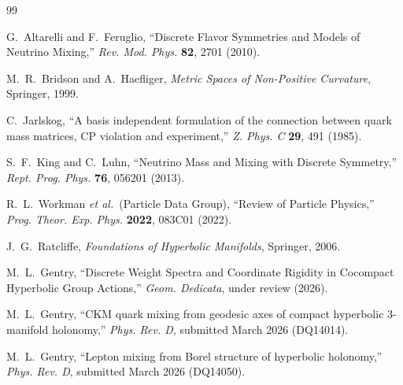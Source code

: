 \documentclass[12pt]{article}
\theoremstyle{definition}
\theoremstyle{remark}
\begin{document}
\begin{thebibliography}{99}

G.~Altarelli and F.~Feruglio,
``Discrete Flavor Symmetries and Models of Neutrino Mixing,''
\emph{Rev. Mod. Phys.} \textbf{82}, 2701 (2010).

M.~R.~Bridson and A.~Haefliger,
\emph{Metric Spaces of Non-Positive Curvature},
Springer, 1999.

C.~Jarlskog,
``A basis independent formulation of the connection between quark mass
matrices, {CP} violation and experiment,''
\emph{Z. Phys. C} \textbf{29}, 491 (1985).

S.~F.~King and C.~Luhn,
``Neutrino Mass and Mixing with Discrete Symmetry,''
\emph{Rept. Prog. Phys.} \textbf{76}, 056201 (2013).

R.~L.~Workman \emph{et al.}\ (Particle Data Group),
``Review of Particle Physics,''
\emph{Prog. Theor. Exp. Phys.} \textbf{2022}, 083C01 (2022).

J.~G.~Ratcliffe,
\emph{Foundations of Hyperbolic Manifolds},
Springer, 2006.

M.~L.~Gentry,
``Discrete Weight Spectra and Coordinate Rigidity in Cocompact Hyperbolic
Group Actions,''
\emph{Geom. Dedicata}, under review (2026).

M.~L.~Gentry,
``{CKM} quark mixing from geodesic axes of compact hyperbolic
3-manifold holonomy,''
\emph{Phys. Rev. D}, submitted March 2026 (DQ14014).

M.~L.~Gentry,
``Lepton mixing from Borel structure of hyperbolic holonomy,''
\emph{Phys. Rev. D}, submitted March 2026 (DQ14050).

\end{thebibliography}
\end{document}
